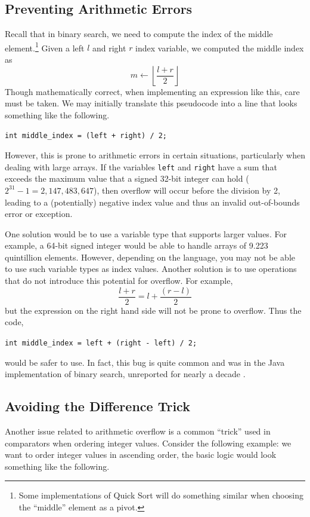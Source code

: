 \subsection{Preventing Arithmetic Errors}

Recall that in binary search, we need to compute the index of the middle 
element.\footnote{Some implementations of Quick Sort will do something 
similar when choosing the ``middle'' element as a pivot.}  Given a left 
$l$ and right $r$ index variable, we computed the middle index as
  $$m \leftarrow \left\lfloor \frac{l + r}{2} \right\rfloor$$
Though mathematically correct, when implementing an expression like this, 
care must be taken.  We may initially translate this pseudocode into a line
that looks something like the following.
  
\texttt{int middle_index = (left + right) / 2;}

However, this is prone to arithmetic errors in certain situations, particularly
when dealing with large arrays.  If the variables \texttt{left} 
and \texttt{right} have a sum that exceeds the maximum value that 
a signed 32-bit integer can hold ($2^{31} - 1 = 2,147,483,647$), then 
overflow will occur before the division by 2, leading to a (potentially) 
negative index value and thus an invalid out-of-bounds error or exception.

One solution would be to use a variable type that supports larger
values.  For example, a 64-bit signed integer would be able to handle
arrays of 9.223 quintillion elements.  However, depending on the language, 
you may not be able to use such variable types as index values.
Another solution is to use operations that do not introduce this 
potential for overflow.  For example, 
  $$\frac{l + r}{2} = l + \frac{(r - l)}{2}$$
but the expression on the right hand side will not be prone to overflow.  
Thus the code,

\texttt{int middle_index = left + (right - left) / 2;}

would be safer to use.  In fact, this bug is quite common 
\cite{Pattis:1988:TEB:52964.53012} and was in the Java implementation
of binary search, unreported for nearly a decade \cite{Bloch2006}.

\subsection{Avoiding the Difference Trick}

Another issue related to arithmetic overflow is a common ``trick'' 
used in comparators when ordering integer values.  Consider the following
example: we want to order integer values in ascending order, the basic
logic would look something like the following.

